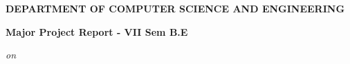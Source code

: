
\begin{titlingpage}

\thispagestyle{empty}
\centering

\setlength{\toptafiddle}{1in}
\setlength{\bottafiddle}{1in}

\vspace*{-0.75in}
\enlargethispage{\toptafiddle}

\vfill
\begin{LARGE}
	\textbf{\textcolor{thered}{DEPARTMENT OF COMPUTER SCIENCE AND ENGINEERING}}\\
\end{LARGE}
\vfill




	\vfill
		\Huge{\textbf{\textcolor{therablue}{Major Project Report - VII Sem B.E}}}
	\vfill



\begin{small}
	\emph{on}
\end{small}


\end{titlingpage}
